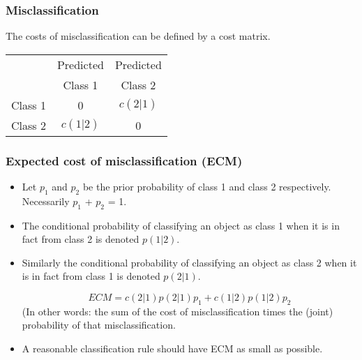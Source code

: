 \documentclass[PredictiveAnalytics101.tex]{subfiles}
\begin{document}
\begin{frame}
\frametitle{Misclassification}
The costs of misclassification can be defined by a cost matrix.
{
\LARGE
\begin{center}
\begin{tabular}{|c|c|c|}
	\hline
	& Predicted & Predicted \\
	& Class 1 & Class 2 \\  \hline
	Class 1 & 0 & $c(2|1)$  \\ \hline
	Class 2 & $c(1|2)$ & 0 \\
	\hline
\end{tabular}
\end{center}
}


\end{frame}
\begin{frame}
\frametitle{Expected cost of misclassification (ECM)}
\begin{itemize}
\item Let $p_1$ and $p_2$ be the prior probability of class 1 and class 2 respectively.
Necessarily $p_1$ + $p_2$ = 1.

\item The conditional probability of classifying an object as class 1 when it is in fact from
class 2 is denoted $p(1|2)$.
\item Similarly the conditional probability of classifying an object as class 2 when it is in
fact from class 1 is denoted $p(2|1)$.

\[ECM = c(2|1)p(2|1)p_1 + c(1|2)p(1|2)p_2\]
(In other words: the sum of the cost of misclassification times the (joint) probability of that misclassification.

\item A reasonable classification rule should have ECM as small as possible.
\end{itemize}
\end{frame}
\end{document}
